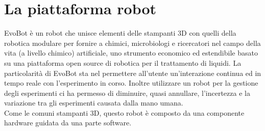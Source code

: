 \chapter{La piattaforma robot}

\label{cha:789}
EvoBot è un robot che unisce elementi delle stampanti 3D con quelli della robotica modulare per fornire a chimici, microbiologi e ricercatori nel campo della vita (a livello chimico) artificiale, uno strumento economico ed estendibile basato su una piattaforma open source di robotica per il trattamento di liquidi. La particolarità di EvoBot sta nel permettere all'utente un'interazione continua ed in tempo reale con l'esperimento in corso.\cite{introd-robot} Inoltre utilizzare un robot per la gestione degli esperimenti ci ha permesso di diminuire, quasi annullare, l'incertezza e la variazione tra gli esperimenti causata dalla mano umana. 
\\Come le comuni stampanti 3D,  questo robot è composto da una componente hardware guidata da una parte software. 

